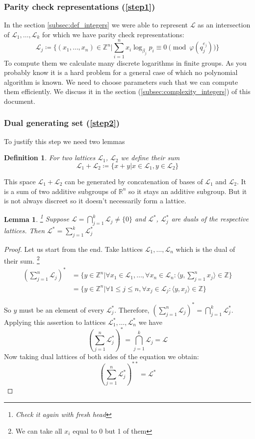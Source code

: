 \documentclass[12pt]{article}
\newcommand{\ZZ}{\mathbb{Z}}
\newcommand{\LL}{\mathcal{L}}
\newtheorem{lemma}{Lemma}
\newtheorem{definition}{Definition}
\begin{document}
\subsubsection{Parity check representations (\ref{step1})}
\label{subsubsec:parity_check_repr}
In the section \ref{subsec:def_integers} we were able to represent $\LL$ as an intersection of $\LL_{1}, \dots, \LL_{k}$ for which we have parity check representations:
\[
    \LL_{j} \coloneqq \{(x_{1}, \dots, x_{n}) \in \ZZ^{n} | \sum_{i=1}^{n}x_{i}\log_{\beta_{j}}p_{i}\equiv 0 \pmod{\varphi(q_{j}^{e_{j}})}\}
\]
To compute them we calculate many discrete logarithms in finite groups. As you probably know it is a hard problem for a general case of which no polynomial algorithm is known. We need to choose parameters such that we can compute them efficiently. We discuss it in the section (\ref{subsec:complexity_integers}) of this document.

\subsubsection{Dual generating set (\ref{step2})}
\label{subsubsec:dual_gen_set}
To justify this step we need two lemmas
\begin{definition}
    For two lattices $\LL_1$, $\LL_2$ we define their sum
\[
    \LL_1 + \LL_2 \coloneqq \{x + y | x \in \LL_1, y \in \LL_2\}
\]
\end{definition}
This space $\LL_{1} + \LL_{2}$ can be generated by concatenation of bases of $\LL_{1}$ and $\LL_{2}$. It is a sum of two additive subgroups of $\mathbb{R}^{n}$ so it stays an additive subgroup. But it is not always discreet so it doesn't necessarily form a lattice.

\begin{lemma}
    \footnote{Check it again with fresh head}
    \label{lemma_intersection}
    Suppose $\LL = \bigcap_{j=1}^{k} \LL_{j} \neq \{0\}$ and $\LL^{*}$, $\LL_{j}^{*}$ are duals of the respective lattices. Then $\LL^{*} = \sum_{j=1}^{k} \LL_{j}^{*}$
\end{lemma}
\begin{proof}
    Let us start from the end. Take lattices $\LL_{1}, \dots, \LL_{n}$ which is the dual of their sum.
    \footnote{We can take all $x_{i}$ equal to 0 but 1 of them}
\[
\begin{split}
(\sum_{j=1}^{n}\LL_j)^{*} & = \{y \in \ZZ^{n} | \forall x_{1} \in \LL_1, \dots, \forall x_{n} \in \LL_n: \langle y, \sum_{j=1}^{n} x_{j} \rangle \in \ZZ \} \\
& = \{y \in \ZZ^{n} | \forall 1 \leq j \leq n, \forall x_{j} \in \LL_j: \langle y,  x_{j} \rangle \in \ZZ \}
\end{split}
\]

So $y$ must be an element of every $\LL_{j}^{*}$. Therefore, $(\sum_{j=1}^{n}\LL_j)^{*} = \bigcap_{j=1}^{k} \LL_{j}^{*}$. Applying this assertion to lattices $\LL_{1}^{*}, \dots, \LL_{n}^{*}$ we have
\[
(\sum_{j=1}^{n}\LL_j^{*})^{*} = \bigcap_{j=1}^{k} \LL_{j} = \LL
\]
Now taking dual lattices of both sides of the equation we obtain:
\[
(\sum_{j=1}^{n}\LL_j^{*})^{**} = \LL^{*}
\]

\end{proof}
\end{document}
